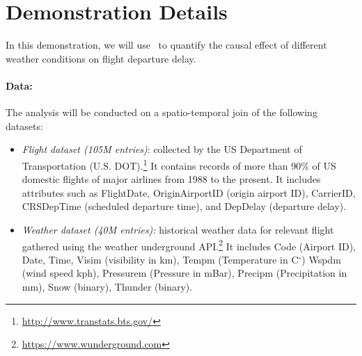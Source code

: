 \section{Demonstration Details}
\label{sec:dd}
 In this demonstration, we will use \GSQL\ to quantify the causal effect of
 different weather conditions on flight departure delay. 
    \paragraph{\bf Data:} The analysis will be conducted on a spatio-temporal join of the following datasets:
 \begin{itemize}
   \item {\it Flight dataset (105M entries)}: collected by the US
Department of Transportation (U.S. DOT).\footnote{\url{http://www.transtats.bts.gov/}} It contains
records of more than 90\% of US domestic flights of major airlines
from 1988 to the present. It includes attributes such as FlightDate, OriginAirportID (origin airport ID), CarrierID, CRSDepTime (scheduled departure time), and DepDelay (departure delay).
   \item {\it Weather dataset (40M entries):} historical weather data for relevant flight gathered using the weather underground API.\footnote{\url{https://www.wunderground.com}} It includes Code (Airport ID),
Date, Time,  Visim (visibility in km),
  Tempm (Temperature in C$^{\circ}$)
  Wspdm (wind speed kph), Pressurem (Pressure in mBar), Precipm  (Precipitation in mm), Snow (binary), Thunder (binary).
 \end{itemize}


 



